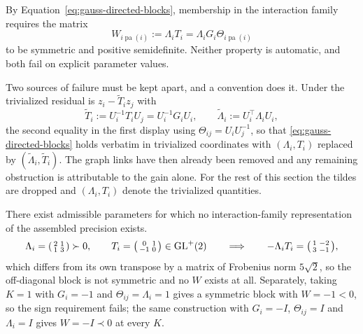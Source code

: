 By Equation~\eqref{eq:gauss-directed-blocks}, membership in the interaction family requires the matrix
\begin{equation}
W_{i\operatorname{pa}(i)}:=\Lambda_iT_i=\Lambda_iG_i\Theta_{i\operatorname{pa}(i)}
\label{eq:gauss-candidate-weight}
\end{equation}
to be symmetric and positive semidefinite. Neither property is automatic, and both fail on explicit parameter values.

Two sources of failure must be kept apart, and a convention does it. Under  the trivialized residual is $z_i-\widetilde T_iz_j$ with
\begin{equation}
\widetilde T_i:=U_i^{-1}T_iU_j=U_i^{-1}G_iU_i,
\qquad
\widetilde\Lambda_i:=U_i^\top\Lambda_iU_i,
\label{eq:gauss-trivialized-transition}
\end{equation}
the second equality in the first display using $\Theta_{ij}=U_iU_j^{-1}$, so that \eqref{eq:gauss-directed-blocks} holds verbatim in trivialized coordinates with $(\Lambda_i,T_i)$ replaced by $(\widetilde\Lambda_i,\widetilde T_i)$. The graph links have then already been removed and any remaining obstruction is attributable to the gain alone. For the rest of this section the tildes are dropped and $(\Lambda_i,T_i)$ denote the trivialized quantities.

There exist admissible parameters for which no interaction-family representation of the assembled precision exists.
\begin{equation}
\Lambda_i=\begin{psmallmatrix}2&1\\1&3\end{psmallmatrix}\succ0,
\qquad
T_i=\begin{psmallmatrix}0&1\\-1&0\end{psmallmatrix}\in\mathrm{GL}^{+}(2)
\qquad\Longrightarrow\qquad
-\Lambda_iT_i=\begin{psmallmatrix}1&-2\\3&-1\end{psmallmatrix},
\label{eq:gauss-asymmetry-witness}
\end{equation}
which differs from its own transpose by a matrix of Frobenius norm $5\sqrt2$, so the off-diagonal block is not symmetric and no $W$ exists at all. Separately, taking $K=1$ with $G_i=-1$ and $\Theta_{ij}=\Lambda_i=1$ gives a symmetric block with $W=-1<0$, so the sign requirement fails; the same construction with $G_i=-I$, $\Theta_{ij}=I$ and $\Lambda_i=I$ gives $W=-I\prec0$ at every $K$. 

